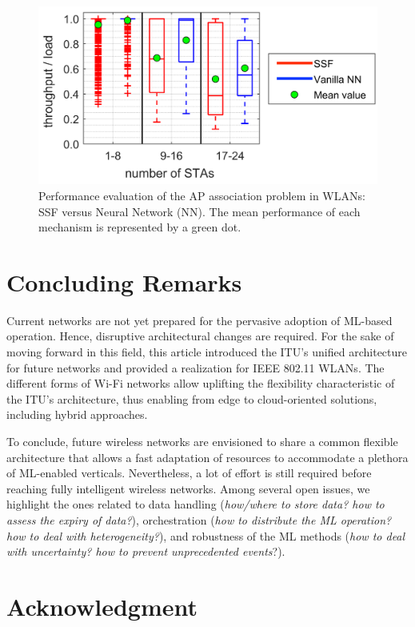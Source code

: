 \documentclass[journal]{IEEEtran}
\begin{document}
\begin{figure}[ht!]
	\centering
	\includegraphics[width=\columnwidth]{output_use_case_ap_association}
	\caption{Performance evaluation of the AP association problem in WLANs: SSF versus Neural Network (NN). The mean performance of each mechanism is represented by a green dot.}
	\label{fig:results_use_case}
\end{figure}

\section{Concluding Remarks}
Current networks are not yet prepared for the pervasive adoption of ML-based operation. Hence, disruptive architectural changes are required. For the sake of moving forward in this field, this article introduced the ITU's unified architecture for future networks and provided a realization for IEEE 802.11 WLANs. The different forms of Wi-Fi networks allow uplifting the flexibility characteristic of the ITU's architecture, thus enabling from edge to cloud-oriented solutions, including hybrid approaches. 

To conclude, future wireless networks are envisioned to share a common flexible architecture that allows a fast adaptation of resources to accommodate a plethora of ML-enabled verticals. Nevertheless, a lot of effort is still required before reaching fully intelligent wireless networks. Among several open issues, we highlight the ones related to data handling (\textit{how/where to store data? how to assess the expiry of data?}), orchestration (\textit{how to distribute the ML operation? how to deal with heterogeneity?}), and robustness of the ML methods (\textit{how to deal with uncertainty? how to prevent unprecedented events}?). 

\section*{Acknowledgment}
\end{document}
